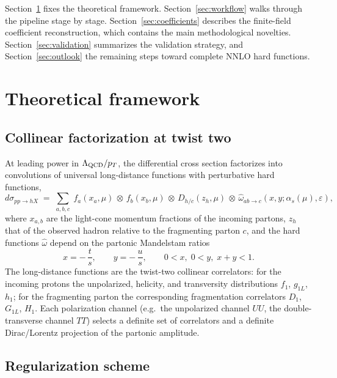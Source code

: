 \documentclass[11pt]{article}
\newcommand{\eps}{\varepsilon}
\newcommand{\as}{\alpha_s}
\begin{document}
Section~\ref{sec:framework} fixes the theoretical framework.
Section~\ref{sec:workflow} walks through the pipeline stage by stage.
Section~\ref{sec:coefficients} describes the finite-field coefficient
reconstruction, which contains the main methodological novelties.
Section~\ref{sec:validation} summarizes the validation strategy, and
Section~\ref{sec:outlook} the remaining steps toward complete NNLO hard
functions.

\section{Theoretical framework}
\label{sec:framework}

\subsection{Collinear factorization at twist two}

At leading power in $\Lambda_{\rm QCD}/p_T$, the differential cross
section factorizes into convolutions of universal long-distance
functions with perturbative hard functions,
\begin{equation}
  d\sigma_{pp\to hX}
  \;=\;
  \sum_{a,b,c}\;
  f_a(x_a,\mu) \,\otimes\, f_b(x_b,\mu) \,\otimes\,
  D_{h/c}(z_h,\mu) \,\otimes\,
  \hat\omega_{ab\to c}\!\left(x,y;\as(\mu),\eps\right),
  \label{eq:fact}
\end{equation}
where $x_{a,b}$ are the light-cone momentum fractions of the incoming
partons, $z_h$ that of the observed hadron relative to the fragmenting
parton $c$, and the hard functions $\hat\omega$ depend on the partonic
Mandelstam ratios
\begin{equation}
  x = -\,\frac{t}{s}, \qquad y = -\,\frac{u}{s},
  \qquad 0 < x,\; 0 < y,\; x+y < 1 .
\end{equation}
The long-distance functions are the twist-two collinear correlators:
for the incoming protons the unpolarized, helicity, and transversity
distributions $f_1$, $g_{1L}$, $h_1$; for the fragmenting parton the
corresponding fragmentation correlators $D_1$, $G_{1L}$, $H_1$.  Each
polarization channel (e.g.\ the unpolarized channel $UU$, the
double-transverse channel $TT$) selects a definite set of correlators
and a definite Dirac/Lorentz projection of the partonic amplitude.

\subsection{Regularization scheme}
\end{document}
